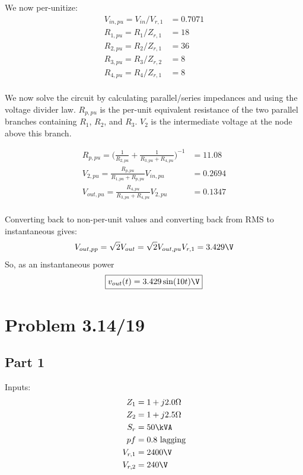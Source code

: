 \documentclass{homework}
\begin{document}
We now per-unitize:
\begin{align*}
    V_{in,pu} = V_{in} / V_{r,1} &= 0.7071 \\
    R_{1,pu} = R_1 / Z_{r,1} &= 18 \\
    R_{2,pu} = R_2 / Z_{r,1} &= 36 \\
    R_{3,pu} = R_3 / Z_{r,2} &= 8 \\
    R_{4,pu} = R_4 / Z_{r,1} &= 8 \\
\end{align*}

We now solve the circuit by calculating parallel/series impedances
and using the voltage divider law. $R_{p,pu}$ is the per-unit
equivalent resistance of the two parallel branches containing
$R_1$, $R_2$, and $R_3$. $V_2$ is the intermediate voltage at the
node above this branch.

\begin{align*}
    R_{p,pu} = \biggl(\frac{1}{R_{2,pu}} + \frac{1}{R_{3,pu} + R_{4,pu}}\biggr)^{-1}
        &= 11.08 \\
    V_{2,pu} = \frac{R_{p,pu}}{R_{1,pu} + R_{p,pu}} V_{in,pu} &= 0.2694 \\
    V_{out,pu} = \frac{R_{4,pu}}{R_{3,pu} + R_{4,pu}} V_{2,pu} &= 0.1347 \\
\end{align*}

Converting back to non-per-unit values and converting back from RMS to instantaneous
gives:
\begin{equation*}
    V_{out,pp} = \sqrt{2} V_{out} = \sqrt{2} V_{out,pu} V_{r,1} = 3.429 \V
\end{equation*}
So, as an instantaneous power
\begin{equation*}
    \boxed{v_{out}(t) = 3.429 \sin(10t) \V}
\end{equation*}

\section{Problem 3.14/19}
\subsection{Part 1}

Inputs:
\begin{align*}
    Z_1 &= 1 + j2.0 \ohm \\
    Z_2 &= 1 + j2.5 \ohm \\
    S_r &= 50 \kVA \\
    pf &= 0.8 \text{ lagging} \\
    V_{r,1} &= 2400 \V \\
    V_{r,2} &= 240 \V \\
\end{align*}
\end{document}
